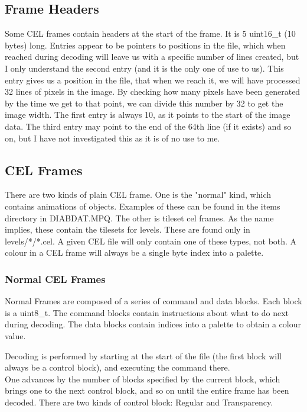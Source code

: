	\subsection{Frame Headers}
	\label{sec:frameheaders}
	Some CEL frames contain headers at the start of the frame. It is 5 uint16\_t (10 bytes) long. Entries appear to be pointers to positions in the file, which when reached during decoding will leave us with a specific number of lines created, but I only understand the second entry (and it is the only one of use to us). This entry gives us a position in the file, that when we reach it, we will have processed 32 lines of pixels in the image. By checking how many pixels have been generated by the time we get to that point, we can divide this number by 32 to get the image width.
	The first entry is always 10, as it points to the start of the image data.
	The third entry may point to the end of the 64th line (if it exists) and so on, but I have not investigated this as it is of no use to me.
	
	\subsection{CEL Frames}
	There are two kinds of plain CEL frame. One is the "normal" kind, which contains animations of objects. Examples of these can be found in the items directory in DIABDAT.MPQ. The other is tileset cel frames. As the name implies, these contain the tilesets for levels. These are found only in levels/*/*.cel.
	A given CEL file will only contain one of these types, not both.
A colour in a CEL frame will always be a single byte index into a palette.

	\subsubsection{Normal CEL Frames}
	Normal Frames are composed of a series of command and data blocks.
	Each block is a uint8\_t.
	The command blocks contain instructions about what to do next during decoding. The data blocks contain indices into a palette to obtain a colour value.
	
	Decoding is performed by starting at the start of the file (the first block will always be a control block), and executing the command there. 
	\\One advances by the number of blocks specified by the current block, which brings one to the next control block, and so on until the entire frame has been decoded. There are two kinds of control block: Regular and Transparency.
	

